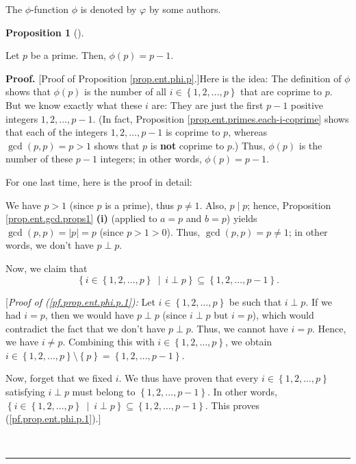 \documentclass[numbers=enddot,12pt,final,onecolumn,notitlepage]{scrartcl}%
\numberwithin{exer}{subsection}
\theoremstyle{definition}
\newtheorem{prop}[theo]{Proposition}
\newenvironment{proposition}[1][]
{\begin{prop}[#1]\begin{leftbar}}
{\end{leftbar}\end{prop}}
\newenvironment{fineprint}{\begin{small}}{\end{small}}
\newenvironment{proof}[1][Proof]{\noindent\textbf{#1.} }{\ \rule{0.5em}{0.5em}}
\begin{document}
The $\phi$-function $\phi$ is denoted by $\varphi$ by some authors.

\begin{proposition}
\label{prop.ent.phi.p}Let $p$ be a prime. Then, $\phi\left(  p\right)  =p-1$.
\end{proposition}

\begin{proof}
[Proof of Proposition \ref{prop.ent.phi.p}.]Here is the idea: The definition
of $\phi$ shows that $\phi\left(  p\right)  $ is the number of all
$i\in\left\{  1,2,\ldots,p\right\}  $ that are coprime to $p$. But we know
exactly what these $i$ are: They are just the first $p-1$ positive integers
$1,2,\ldots,p-1$. (In fact, Proposition \ref{prop.ent.primes.each-i-coprime}
shows that each of the integers $1,2,\ldots,p-1$ is coprime to $p$, whereas
$\gcd\left(  p,p\right)  =p>1$ shows that $p$ is \textbf{not} coprime to $p$.)
Thus, $\phi\left(  p\right)  $ is the number of these $p-1$ integers; in other
words, $\phi\left(  p\right)  =p-1$.

\begin{fineprint}
For one last time, here is the proof in detail:

We have $p>1$ (since $p$ is a prime), thus $p\neq1$. Also, $p\mid p$; hence,
Proposition \ref{prop.ent.gcd.props1} \textbf{(i)} (applied to $a=p$ and
$b=p$) yields $\gcd\left(  p,p\right)  =\left\vert p\right\vert =p$ (since
$p>1>0$). Thus, $\gcd\left(  p,p\right)  =p\neq1$; in other words, we don't
have $p\perp p$.

Now, we claim that%
\begin{equation}
\left\{  i\in\left\{  1,2,\ldots,p\right\}  \ \mid\ i\perp p\right\}
\subseteq\left\{  1,2,\ldots,p-1\right\}  . \label{pf.prop.ent.phi.p.1}%
\end{equation}


[\textit{Proof of (\ref{pf.prop.ent.phi.p.1}):} Let $i\in\left\{
1,2,\ldots,p\right\}  $ be such that $i\perp p$. If we had $i=p$, then we
would have $p\perp p$ (since $i\perp p$ but $i=p$), which would contradict the
fact that we don't have $p\perp p$. Thus, we cannot have $i=p$. Hence, we have
$i\neq p$. Combining this with $i\in\left\{  1,2,\ldots,p\right\}  $, we
obtain $i\in\left\{  1,2,\ldots,p\right\}  \setminus\left\{  p\right\}
=\left\{  1,2,\ldots,p-1\right\}  $.

Now, forget that we fixed $i$. We thus have proven that every $i\in\left\{
1,2,\ldots,p\right\}  $ satisfying $i\perp p$ must belong to $\left\{
1,2,\ldots,p-1\right\}  $. In other words, $\left\{  i\in\left\{
1,2,\ldots,p\right\}  \ \mid\ i\perp p\right\}  \subseteq\left\{
1,2,\ldots,p-1\right\}  $. This proves (\ref{pf.prop.ent.phi.p.1}).]


\end{fineprint}
\end{proof}
\end{document}
